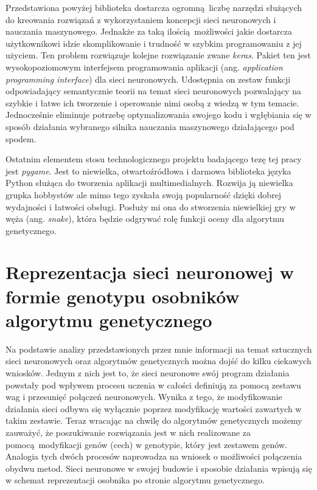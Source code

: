 \documentclass[12pt, oneside, a4paper]{report}
\begin{document}
Przedstawiona powyżej biblioteka dostarcza ogromną liczbę narzędzi służących do kreowania rozwiązań z wykorzystaniem koncepcji sieci neuronowych i nauczania maszynowego. Jednakże za taką ilością możliwości jakie dostarcza użytkownikowi idzie skomplikowanie i trudność w szybkim programowaniu z jej użyciem. Ten problem rozwiązuje kolejne rozwiązanie zwane \textit{keras}. Pakiet ten jest wysokopoziomowym interfejsem programowania aplikacji (ang. \textit{application programming interface}) dla sieci neuronowych. Udostępnia on zestaw funkcji odpowiadający semantycznie teorii na temat sieci neuronowych pozwalający na szybkie i łatwe ich tworzenie i operowanie nimi osobą z wiedzą w tym temacie. Jednocześnie eliminuje potrzebę optymalizowania swojego kodu i wgłębiania się w sposób działania wybranego silnika nauczania maszynowego działającego pod spodem.

Ostatnim elementem stosu technologicznego projektu badającego tezę tej pracy jest \textit{pygame}. Jest to niewielka, otwartoźródłowa i darmowa biblioteka języka Python służąca do tworzenia aplikacji multimedialnych. Rozwija ją niewielka grupka hobbystów ale mimo tego zyskała swoją popularność dzięki dobrej wydajności i łatwości obsługi. Posłuży mi ona do stworzenia niewielkiej gry w węża (ang. \textit{snake}), która będzie odgrywać rolę funkcji oceny dla algorytmu genetycznego.

\section{Reprezentacja sieci neuronowej w formie genotypu osobników algorytmu genetycznego}

Na podstawie analizy przedstawionych przez mnie informacji na temat sztucznych sieci neuronowych oraz algorytmów genetycznych można dojść do kilku ciekawych wniosków. Jednym z nich jest to, że sieci neuronowe swój program działania powstały pod wpływem procesu uczenia w całości definiują za pomocą zestawu wag i przesunięć połączeń neuronowych. Wynika z tego, że modyfikowanie działania sieci odbywa się wyłącznie poprzez modyfikację wartości zawartych w takim zestawie. Teraz wracając na chwilę do algorytmów genetycznych możemy zauważyć, że poszukiwanie rozwiązania jest w nich realizowane za pomocą modyfikacji genów (cech) w genotypie, który jest zestawem genów. Analogia tych dwóch procesów naprowadza na wniosek o możliwości połączenia obydwu metod. Sieci neuronowe w swojej budowie i sposobie działania wpisują się w schemat reprezentacji osobnika po stronie algorytmu genetycznego.
\end{document}
